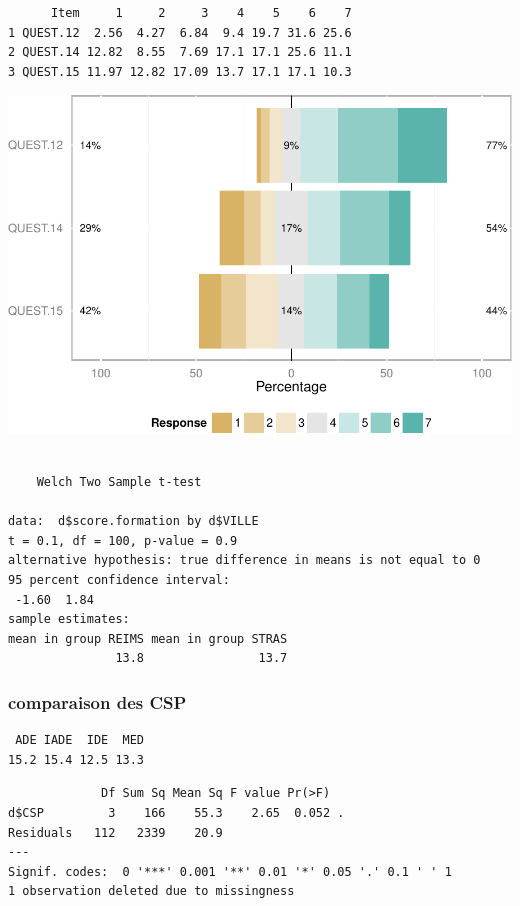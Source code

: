\documentclass[]{article}
\begin{document}
\begin{verbatim}
      Item     1     2     3    4    5    6    7
1 QUEST.12  2.56  4.27  6.84  9.4 19.7 31.6 25.6
2 QUEST.14 12.82  8.55  7.69 17.1 17.1 25.6 11.1
3 QUEST.15 11.97 12.82 17.09 13.7 17.1 17.1 10.3
\end{verbatim}

\includegraphics{analyse_files/figure-latex/unnamed-chunk-15-2.pdf}

\begin{verbatim}

    Welch Two Sample t-test

data:  d$score.formation by d$VILLE
t = 0.1, df = 100, p-value = 0.9
alternative hypothesis: true difference in means is not equal to 0
95 percent confidence interval:
 -1.60  1.84
sample estimates:
mean in group REIMS mean in group STRAS 
               13.8                13.7 
\end{verbatim}

\subsubsection{comparaison des CSP}\label{comparaison-des-csp-1}

\begin{verbatim}
 ADE IADE  IDE  MED 
15.2 15.4 12.5 13.3 
\end{verbatim}

\begin{verbatim}
             Df Sum Sq Mean Sq F value Pr(>F)  
d$CSP         3    166    55.3    2.65  0.052 .
Residuals   112   2339    20.9                 
---
Signif. codes:  0 '***' 0.001 '**' 0.01 '*' 0.05 '.' 0.1 ' ' 1
1 observation deleted due to missingness
\end{verbatim}
\end{document}
